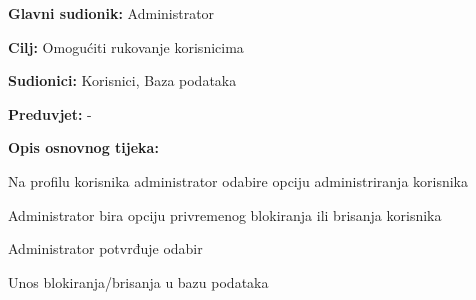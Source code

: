 				
					\noindent {}
					\begin{packed_item}
						
						\item \textbf{Glavni sudionik: }Administrator
						\item  \textbf{Cilj:} Omogućiti rukovanje korisnicima 
						\item  \textbf{Sudionici:} Korisnici, Baza podataka
						\item  \textbf{Preduvjet:} -
						\item  \textbf{Opis osnovnog tijeka:}
						
						\item[] \begin{packed_enum}
							
							\item Na profilu korisnika administrator odabire opciju administriranja korisnika
							\item Administrator bira opciju privremenog blokiranja ili brisanja korisnika
							\item Administrator potvrđuje odabir
							\item Unos blokiranja/brisanja u bazu podataka
						\end{packed_enum}
						
					\end{packed_item}
				
